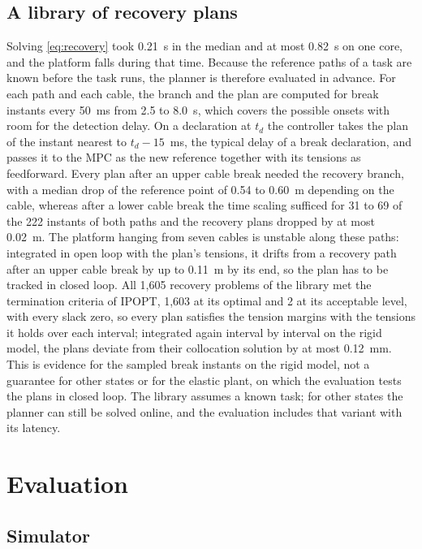 \documentclass[a4paper,fleqn]{cas-dc}
\begin{document}
\subsection{A library of recovery plans}\label{sec:library}

Solving \eqref{eq:recovery} took 0.21~s in the median and at most 0.82~s on one core, and the platform falls during that time. Because the reference paths of a task are known before the task runs, the planner is therefore evaluated in advance. For each path and each cable, the branch and the plan are computed for break instants every 50~ms from 2.5 to 8.0~s, which covers the possible onsets with room for the detection delay. On a declaration at $t_d$ the controller takes the plan of the instant nearest to $t_d-15$~ms, the typical delay of a break declaration, and passes it to the MPC as the new reference together with its tensions as feedforward. Every plan after an upper cable break needed the recovery branch, with a median drop of the reference point of 0.54 to 0.60~m depending on the cable, whereas after a lower cable break the time scaling sufficed for 31 to 69 of the 222 instants of both paths and the recovery plans dropped by at most 0.02~m. The platform hanging from seven cables is unstable along these paths: integrated in open loop with the plan's tensions, it drifts from a recovery path after an upper cable break by up to 0.11~m by its end, so the plan has to be tracked in closed loop. All 1,605 recovery problems of the library met the termination criteria of IPOPT, 1,603 at its optimal and 2 at its acceptable level, with every slack zero, so every plan satisfies the tension margins with the tensions it holds over each interval; integrated again interval by interval on the rigid model, the plans deviate from their collocation solution by at most 0.12~mm. This is evidence for the sampled break instants on the rigid model, not a guarantee for other states or for the elastic plant, on which the evaluation tests the plans in closed loop. The library assumes a known task; for other states the planner can still be solved online, and the evaluation includes that variant with its latency.

\section{Evaluation}\label{sec:evaluation}

\subsection{Simulator}\label{sec:simulator}
\end{document}
